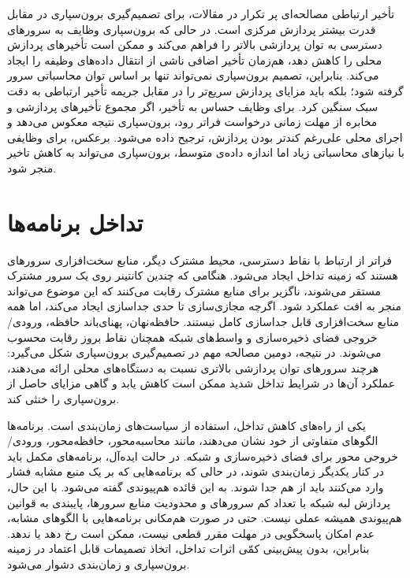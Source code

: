 تأخیر ارتباطی مصالحه‌ای پر تکرار در مقالات، برای تصمیم‌گیری برون‌سپاری در مقابل قدرت بیشتر پردازش مرکزی است. در حالی که برون‌سپاری وظایف به سرورهای  دسترسی به توان پردازشی بالاتر را فراهم می‌کند و ممکن است تأخیرهای پردازش محلی را کاهش دهد، هم‌زمان تأخیر اضافی ناشی از انتقال ‌داده‌های وظیفه را ایجاد می‌کند. بنابراین، تصمیم برون‌سپاری نمی‌تواند تنها بر اساس توان محاسباتی سرور  گرفته شود؛ بلکه باید مزایای پردازش سریع‌تر را در مقابل جریمه‌ تأخیر ارتباطی به دقت سبک سنگین کرد. برای وظایف حساس به تأخیر، اگر مجموع تأخیرهای پردازشی و مخابره از مهلت زمانی درخواست فراتر رود، برون‌سپاری نتیجه معکوس می‌دهد و اجرای محلی علی‌رغم کندتر بودن پردازش، ترجیح داده می‌شود. برعکس، برای وظایفی با نیازهای محاسباتی زیاد اما اندازه داده‌ی متوسط، برون‌سپاری می‌تواند به کاهش تاخیر منجر شود.

\section{تداخل برنامه‌ها}
\label{subsec:interference_model}

فراتر از ارتباط با نقاط دسترسی، محیط مشترک دیگر، منابع سخت‌افزاری سرورهای  هستند که زمینه تداخل ایجاد می‌شود. هنگامی که چندین کانتینر روی یک سرور مشترک مستقر می‌شوند، ناگزیر برای منابع مشترک رقابت می‌کنند که این موضوع می‌تواند منجر به افت عملکرد شود. اگرچه مجازی‌سازی تا حدی جداسازی ایجاد می‌کند، اما همه منابع سخت‌افزاری قابل جداسازی کامل نیستند. حافظه‌نهان‌، پهنای‌باند حافظه، ورودی/خروجی فضای ذخیره‌سازی و واسط‌های شبکه همچنان نقاط بروز رقابت محسوب می‌شوند. در نتیجه، دومین مصالحه مهم در تصمیم‌گیری برون‌سپاری شکل می‌گیرد: هرچند سرورهای  توان پردازشی بالاتری نسبت به دستگاه‌های محلی ارائه می‌دهند، عملکرد آن‌ها در شرایط تداخل شدید ممکن است کاهش یابد و گاهی مزایای حاصل از برون‌سپاری را خنثی کند.

یکی از راه‌های کاهش تداخل، استفاده از سیاست‌های زمان‌بندی است. برنامه‌ها الگوهای متفاوتی از خود نشان می‌دهند، مانند محاسبه‌محور، حافظه‌محور، ورودی/خروجی ‌محور برای فضای ذخیره‌سازی و شبکه. در حالت ایده‌آل، برنامه‌های مکمل باید در کنار یکدیگر زمان‌بندی شوند، در حالی که برنامه‌هایی که بر یک منبع مشابه فشار وارد می‌کنند باید از هم جدا شوند. به این قائده هم‌پیوندی گفته می‌شود. با این حال، پردازش لبه شبکه با تعداد کم سرورهای  و محدودیت منابع سرورها، پایبندی به قوانین هم‌پیوندی همیشه عملی نیست. حتی در صورت هم‌مکانی برنامه‌هایی با الگوهای مشابه، عدم امکان پاسخگویی در مهلت مقرر قطعی نیست، ممکن است رخ دهد یا ندهد. بنابراین، بدون پیش‌بینی کمّی اثرات تداخل، اتخاذ تصمیمات قابل اعتماد در زمینه برون‌سپاری و زمان‌بندی دشوار می‌شود.

